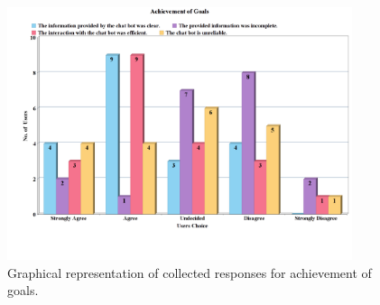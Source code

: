 \begin{figure}[!h]
    \centering
    \includegraphics[width=0.9\textwidth]{img/Achievement_of_Goals_Updated_2.png}
    \caption{Graphical representation of collected responses for achievement of goals.}
    \label{fig:achievGoals}
\end{figure}

